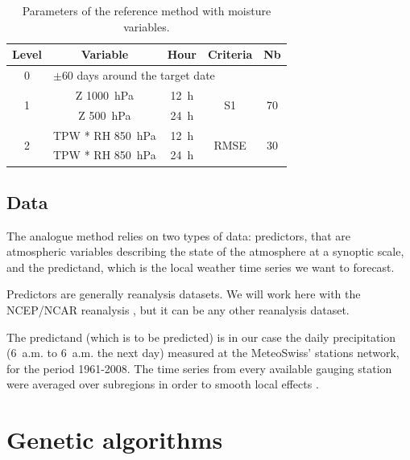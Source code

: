 \documentclass[5p]{elsarticle}
\begin{document}
\begin{table}[htbp]
	\caption{Parameters of the reference method with moisture variables.}
	\footnotesize
	\begin{center}
		\begin{tabular}{ccccc}
			\hline 
			Level & Variable & Hour & Criteria & Nb \\ 
			\hline 
			0 & \multicolumn{4}{l}{$\pm 60$ days around the target date} \\
			\hline 
			\multirow{2}{*}{1} & Z 1000~hPa & 12~h & \multirow{2}{*}{S1} & \multirow{2}{*}{70} \\
			& Z 500~hPa & 24~h & & \\ 
			\hline
			\multirow{2}{*}{2} & TPW * RH 850~hPa & 12~h & \multirow{2}{*}{RMSE} & \multirow{2}{*}{30} \\
			& TPW * RH 850~hPa & 24~h & & \\ 
			\hline 
		\end{tabular} 
	\end{center}
	\label{table:params_R2}
\end{table}

\subsection{Data}
\label{section_data}

The analogue method relies on two types of data: predictors, that are atmospheric variables describing the state of the atmosphere at a synoptic scale, and the predictand, which is the local weather time series we want to forecast.

Predictors are generally reanalysis datasets. We will work here with the NCEP/NCAR reanalysis \citep[6-hourly, 17 pressure levels at a resolution of 2.5\degree, see][]{Kalnay1996}, but it can be any other reanalysis dataset.

The predictand (which is to be predicted) is in our case the daily precipitation (6~a.m. to 6~a.m. the next day) measured at the MeteoSwiss' stations network, for the period 1961-2008. The time series from every available gauging station were averaged over subregions in order to smooth local effects \citep{Obled2002, Marty2012}.





\section{Genetic algorithms}
\end{document}
